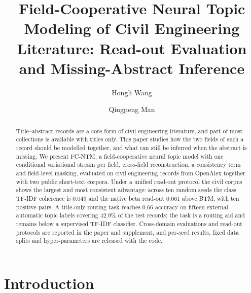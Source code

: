 \documentclass[Journal,letterpaper]{ascelike-new}
\begin{document}
\title{Field-Cooperative Neural Topic Modeling of Civil Engineering Literature:
Read-out Evaluation and Missing-Abstract Inference}

\author[1]{Hongli Wang}
\author[1]{Qingpeng Man}


\maketitle

\begin{abstract}
Title--abstract records are a core form of civil engineering literature, and part of most
collections is available with titles only. This paper studies how the two fields of such a record
should be modelled together, and what can still be inferred when the abstract is missing. We
present FC-NTM, a field-cooperative neural topic model with one conditional variational stream per
field, cross-field reconstruction, a consistency term and field-level masking, evaluated on civil
engineering records from OpenAlex together with two public short-text corpora. Under a unified
read-out protocol the civil corpus shows the largest and most consistent advantage: across ten
random seeds the class TF-IDF coherence is 0.049 and the native beta read-out 0.061 above BTM,
with ten positive pairs. A title-only routing task reaches 0.66 accuracy on fifteen external
automatic topic labels covering 42.9\% of the test records; the task is a routing aid and remains
below a supervised TF-IDF classifier. Cross-domain evaluations and read-out protocols are
reported in the paper and supplement, and per-seed results, fixed data splits and
hyper-parameters are released with the code.
\end{abstract}


\section{Introduction}
\end{document}
